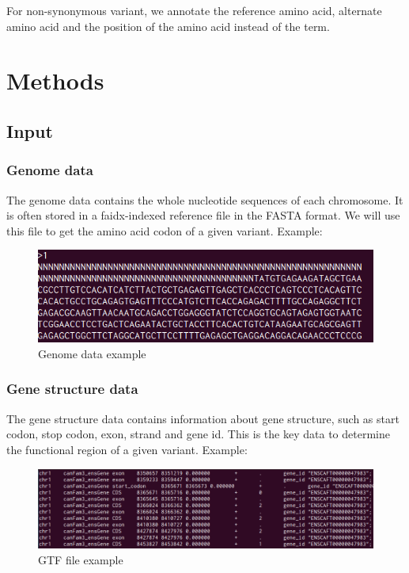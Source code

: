 \documentclass[onehalf,11pt]{beavtex}
\begin{document}
For non-synonymous variant, we annotate the reference amino acid, alternate amino acid and the position of the amino acid instead of the term.


\chapter{Methods}

\section{Input}

\subsection{Genome data}
The genome data contains the whole nucleotide sequences of each chromosome. It is often stored in a faidx-indexed reference file in the FASTA format. We will use this file to get the amino acid codon of a given variant.
Example:

\begin{figure}[!ht]
\centering
\includegraphics[scale=0.8]{./pic/genome.png}
\caption{Genome data example}
\end{figure}

\subsection{Gene structure data}
The gene structure data contains information about gene structure, such as start codon, stop codon, exon, strand and gene id. This is the key data to determine the functional region of a given variant. Example:

\begin{figure}[!ht]
\centering
\includegraphics[scale=0.6]{./pic/gtf.png}
\caption{GTF file example}
\end{figure}
\end{document}
